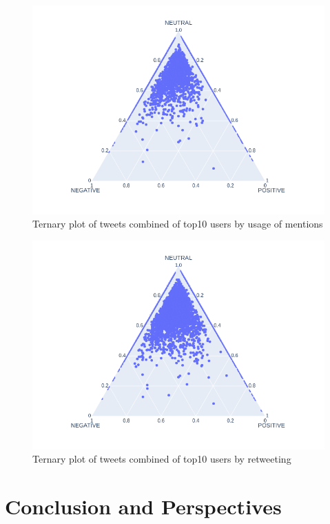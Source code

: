 \documentclass[conference]{IEEEtran}
\begin{document}
\begin{figure}
\includegraphics[scale=0.4]{figures/sentiment_ternary_amount_mentions}
\caption{Ternary plot of tweets combined of top10 users by usage of mentions }
\label{fig:sentiment-ternary-user-mention}
\end{figure}

\begin{figure}
\includegraphics[scale=0.4]{figures/sentiment_ternary_all}
\caption{Ternary plot of tweets combined of top10 users by retweeting }
\label{fig:sentiment-ternary-user-retweet}
\end{figure}
\section{Conclusion and Perspectives}\label{sec:conclusion-and-perspectives}
\end{document}
